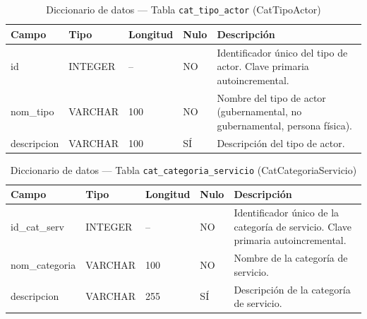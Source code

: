 \begin{table}[H]
	\centering
	\caption{Diccionario de datos --- Tabla \texttt{cat\_tipo\_actor} (CatTipoActor)}
	\label{tab:data-dict-cat_tipo_actor}
	\scriptsize
	\begin{tabular}{>{\ttfamily\raggedright\arraybackslash}p{3.6cm} p{1.6cm} p{1.3cm} p{0.7cm} p{5.6cm}}
		\toprule
		\textbf{Campo} & \textbf{Tipo} & \textbf{Longitud} & \textbf{Nulo} & \textbf{Descripción} \\
		\midrule
		id & INTEGER & -- & NO & Identificador único del tipo de actor. Clave primaria autoincremental. \\
		nom\_tipo & VARCHAR & 100 & NO & Nombre del tipo de actor (gubernamental, no gubernamental, persona física). \\
		descripcion & VARCHAR & 100 & SÍ & Descripción del tipo de actor. \\
		\bottomrule
	\end{tabular}
\end{table}

\begin{table}[H]
	\centering
	\caption{Diccionario de datos --- Tabla \texttt{cat\_categoria\_servicio} (CatCategoriaServicio)}
	\label{tab:data-dict-cat_categoria_servicio}
	\scriptsize
	\begin{tabular}{>{\ttfamily\raggedright\arraybackslash}p{3.6cm} p{1.6cm} p{1.3cm} p{0.7cm} p{5.6cm}}
		\toprule
		\textbf{Campo} & \textbf{Tipo} & \textbf{Longitud} & \textbf{Nulo} & \textbf{Descripción} \\
		\midrule
		id\_cat\_serv & INTEGER & -- & NO & Identificador único de la categoría de servicio. Clave primaria autoincremental. \\
		nom\_categoria & VARCHAR & 100 & NO & Nombre de la categoría de servicio. \\
		descripcion & VARCHAR & 255 & SÍ & Descripción de la categoría de servicio. \\
		\bottomrule
	\end{tabular}
\end{table}

